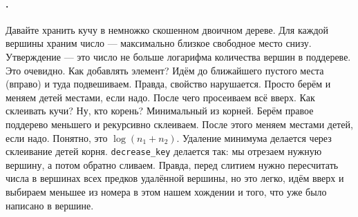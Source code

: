 \documentclass{article}
\newcommand{\pseudo}{PseudoLexer.py:PseudoLexer -x}
\newcommand{\pseudocode}[1]{\texttt{#1}}
\begin{document}
    \paragraph{.}
    Давайте хранить кучу в немножко скошенном двоичном дереве. Для каждой вершины храним число --- максимально близкое свободное место снизу. Утверждение --- это число не больше логарифма количества вершин в поддереве. Это очевидно. Как добавлять элемент? Идём до ближайшего пустого места (вправо) и туда подвешиваем. Правда, свойство нарушается. Просто берём и меняем детей местами, если надо. После чего просеиваем всё вверх.
    Как склеивать кучи? Ну, кто корень? Минимальный из корней. Берём правое поддерево меньшего и рекурсивно склеиваем. После этого меняем местами детей, если надо. Понятно, это $\log(n_1+n_2)$. Удаление минимума делается через склеивание детей корня.
    \pseudocode{decrease_key} делается так: мы отрезаем нужную вершину, а потом обратно сливаем. Правда, перед слитием нужно пересчитать числа в вершинах всех предков удалённой вершины, но это легко, идём вверх и выбираем меньшее из номера в этом нашем хождении и того, что уже было написано в вершине.
\end{document}
